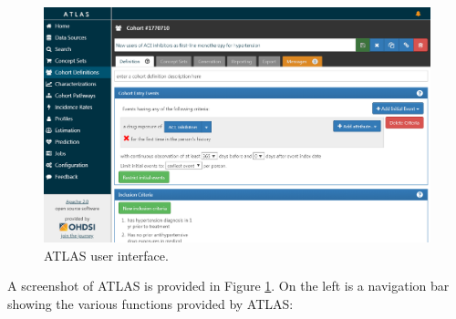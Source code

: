 \documentclass[11pt]{book}
\theoremstyle{definition}
\theoremstyle{definition}
\theoremstyle{definition}
\theoremstyle{remark}
\begin{document}
\begin{figure}

{\centering \includegraphics[width=1\linewidth]{images/OhdsiAnalyticsTools/atlas} 

}

\caption{ATLAS user interface.}\label{fig:atlas}
\end{figure}

A screenshot of ATLAS is provided in Figure \ref{fig:atlas}. On the left is a navigation bar showing the various functions provided by ATLAS:
\end{document}
